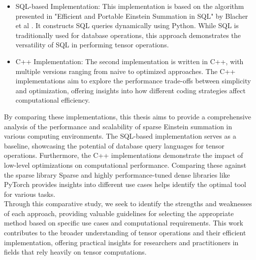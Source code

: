 \begin{itemize}
      \item SQL-based Implementation:
            This implementation is based on the algorithm presented in "Efficient and
            Portable Einstein Summation in SQL" by Blacher et al \cite{sql_einsum}.
            It constructs SQL queries dynamically using Python. While SQL is
            traditionally used for database operations, this approach demonstrates
            the versatility of SQL in performing tensor operations.
      \item C++ Implementation: The second implementation is written in C++, with multiple
            versions ranging from naive to optimized approaches. The C++ implementations
            aim to explore the performance trade-offs between simplicity and optimization,
            offering insights into how different coding strategies affect computational efficiency.
\end{itemize}
%
%
By comparing these implementations, this thesis aims to provide a comprehensive
analysis of the performance and scalability of sparse Einstein summation in various
computing environments. The SQL-based implementation serves as a baseline,
showcasing the potential of database query languages for tensor operations.
Furthermore, the C++ implementations demonstrate the impact of low-level optimizations
on computational performance. Comparing these against the sparse library Sparse and
highly performance-tuned dense libraries like PyTorch provides insights into different
use cases helps identify the optimal tool for various tasks.
\\
Through this comparative study, we seek to identify the strengths and weaknesses
of each approach, providing valuable guidelines for selecting the appropriate
method based on specific use cases and computational requirements. This work
contributes to the broader understanding of tensor operations and their efficient
implementation, offering practical insights for researchers and practitioners
in fields that rely heavily on tensor computations.